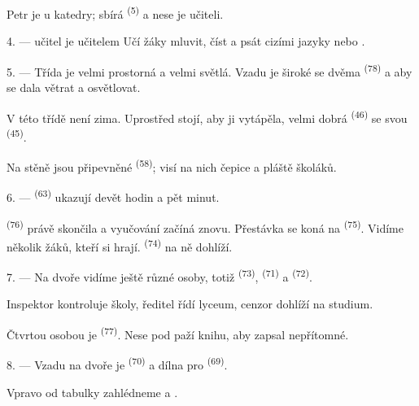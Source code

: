 Petr je u katedry; sbírá  \textsuperscript{(5)} a nese je učiteli.

4. ---  učitel je učitelem  Učí žáky mluvit, číst a psát
cizími jazyky  nebo
.

5. --- Třída je velmi prostorná a velmi světlá. Vzadu je široké  se dvěma
 \textsuperscript{(78)} a  aby se dala větrat a
osvětlovat.

V této třídě není zima. Uprostřed stojí, aby ji vytápěla, velmi dobrá 
\textsuperscript{(46)} se svou  \textsuperscript{(45)}.

Na stěně jsou připevněné  \textsuperscript{(58)}; visí na nich čepice a pláště
školáků.

\VUsaut{5.2mm}
\VUsaut{3.6mm}

6. ---  \textsuperscript{(63)} ukazují devět hodin a pět minut.

 \textsuperscript{(76)} právě skončila a vyučování začíná znovu.
Přestávka se koná na  \textsuperscript{(75)}. Vidíme několik žáků, kteří si
hrají.  \textsuperscript{(74)} na ně dohlíží.

7. --- Na dvoře vidíme ještě různé osoby, totiž  \textsuperscript{(73)},
 \textsuperscript{(71)} a  \textsuperscript{(72)}.

Inspektor kontroluje školy, ředitel řídí lyceum, cenzor dohlíží na studium.

Čtvrtou osobou je  \textsuperscript{(77)}. Nese pod paží knihu, aby zapsal
nepřítomné.

8. --- Vzadu na dvoře je  \textsuperscript{(70)} a dílna pro
 \textsuperscript{(69)}.

Vpravo od tabulky zahlédneme   a .


